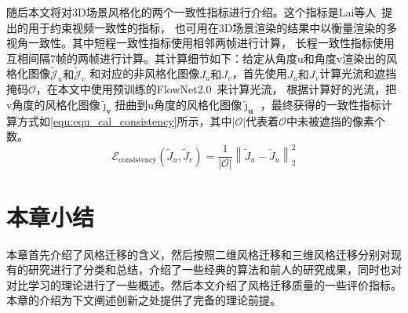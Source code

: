 \par 随后本文将对3D场景风格化的两个一致性指标进行介绍。这个指标是Lai等人~\cite{lai2018learning}提出的用于约束视频一致性的指标，
也可用在3D场景渲染的结果中以衡量渲染的多视角一致性。其中短程一致性指标使用相邻两帧进行计算，
长程一致性指标使用互相间隔7帧的两帧进行计算。其计算细节如下：给定从角度u和角度v渲染出的风格化图像\(\tilde{\mathcal{J}}_u\text{和}\tilde{\mathcal{J}}_v\)
和对应的非风格化图像\(J_u\text{和}J_v\)，首先使用\(J_u\text{和}J_v\)计算光流和遮挡掩码$\mathcal{O}$，在本文中使用预训练的FlowNet2.0~\cite{ilg2017flownet}来计算光流，
根据计算好的光流，把v角度的风格化图像\(\tilde{\boldsymbol{\jmath}}_{\boldsymbol{v}}\)扭曲到u角度的风格化图像\(\tilde{\boldsymbol{\jmath}}_{\boldsymbol{u}}\)
，最终获得的一致性指标计算方式如\autoref{equ:equ_cal_consistency}所示，其中$|\mathcal{O}|$代表着$\mathcal{O}$中未被遮挡的像素个数。
\begin{equation}
    \label{equ:equ_cal_consistency}
    \mathcal{E}_\text{consistency}{(\tilde{J}_u,\tilde{J}_v)}=\frac1{|\mathcal{O}|}\left\|\tilde{J}_u-\check{J}_u\right\|_2^2
\end{equation}



\section{本章小结}
本章首先介绍了风格迁移的含义，然后按照二维风格迁移和三维风格迁移分别对现有的研究进行了分类和总结，介绍了一些经典的算法和前人的研究成果，同时也对对比学习的理论进行了一些概述。然后本文介绍了风格迁移质量的一些评价指标。本章的介绍为下文阐述创新之处提供了完备的理论前提。 






